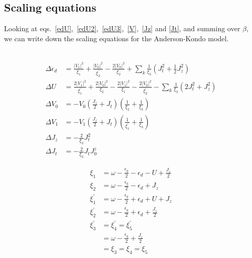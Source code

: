 \documentclass[twoside]{report}
\numberwithin{equation}{section}
\begin{document}
\subsection{Scaling equations}
Looking at eqs.~\ref{edU},~\ref{edU2},~\ref{edU3},~\ref{V},~\ref{Jz} and \ref{Jt}, and summing over \(\beta\), we can write down the scaling equations for the Anderson-Kondo model.
\\\\\begin{minipage}{320pt}
\begin{equation}\begin{aligned}
	\Delta \epsilon_d &= \frac{|V_1|^2}{\xi_1} + \frac{|V_0|^2}{\xi_2^\prime} - \frac{2|V_0|^2}{\xi_2} + \sum_k \frac{1}{\xi_3}\left(J_t^2  + \frac{1}{2}J_z^2\right)\\
	\Delta U &= \frac{2|V_1|^2}{\xi_1^\prime} + \frac{2|V_0|^2}{\xi_2} - \frac{2|V_1|^2}{\xi_1} - \frac{2|V_0|^2}{\xi_2^\prime} - \sum_k \frac{1}{\xi_3}\left(2J_t^2 + J_z^2\right)\\
	\Delta V_0 &= -V_0\left(\frac{J_z}{2} + J_t \right) \left(\frac{1}{\xi_2} + \frac{1}{\xi_3}\right)\\
	\Delta V_1 &= -V_1\left(\frac{J_z}{2} + J_t \right) \left(\frac{1}{\xi^\prime_1} + \frac{1}{\xi_3}\right)\\
	\Delta J_z &= -\frac{2}{\xi_3}J_t^2\\
	\Delta J_t &= -\frac{2}{\xi_3}J_t J^z_0
\end{aligned}\end{equation}
\end{minipage}
\vline
\begin{minipage}{150pt}
\begin{equation*}\begin{aligned}
	\xi_1 &= \omega - \frac{\epsilon_q}{2} - \epsilon_d - U + \frac{J_z}{2}\\
	\xi_2 &= \omega - \frac{\epsilon_q}{2} - \epsilon_d + J_z\\
	\xi_1^\prime &= \omega - \frac{\epsilon_q}{2} + \epsilon_d + U + J_z\\
	\xi_2^\prime &= \omega - \frac{\epsilon_q}{2} + \epsilon_d + \frac{J_z}{2}\\
	\xi_3^\prime &= \xi_4^\prime = \xi_5^\prime \\
		     &= \omega - \frac{\epsilon_q}{2} + \frac{J_z}{2}\\
		     &= \xi_3 = \xi_4 = \xi_5\\
\end{aligned}\end{equation*}
\end{minipage}
\end{document}
